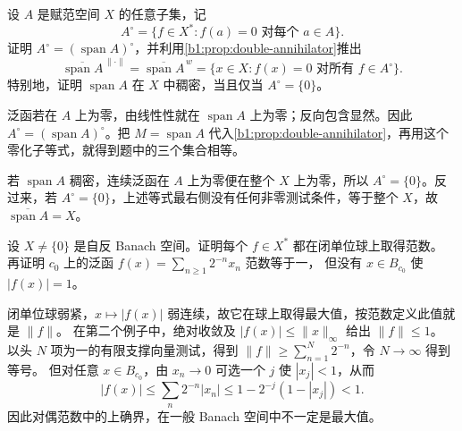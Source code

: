 \begin{exercise}\label{b1:ex:09-double-annihilator}
设 \(A\) 是赋范空间 \(X\) 的任意子集，记
\[
 A^\circ=\{f\in X^*:f(a)=0\text{ 对每个 }a\in A\}.
\]
证明 \(A^\circ=(\operatorname{span}A)^\circ\)，并利用\cref{b1:prop:double-annihilator}推出
\[
 \overline{\operatorname{span}A}^{\,\|\cdot\|}
 =\overline{\operatorname{span}A}^{\,w}
 =\{x\in X:f(x)=0\text{ 对所有 }f\in A^\circ\}.
\]
特别地，证明 \(\operatorname{span}A\) 在 \(X\) 中稠密，当且仅当 \(A^\circ=\{0\}\)。
\end{exercise}
\begin{solution}
泛函若在 \(A\) 上为零，由线性性就在 \(\operatorname{span}A\) 上为零；反向包含显然。因此
\(A^\circ=(\operatorname{span}A)^\circ\)。把 \(M=\operatorname{span}A\) 代入\cref{b1:prop:double-annihilator}，再用这个零化子等式，就得到题中的三个集合相等。

若 \(\operatorname{span}A\) 稠密，连续泛函在 \(A\) 上为零便在整个 \(X\) 上为零，所以 \(A^\circ=\{0\}\)。反过来，若 \(A^\circ=\{0\}\)，上述等式最右侧没有任何非零测试条件，等于整个 \(X\)，故 \(\overline{\operatorname{span}A}=X\)。
\end{solution}

\begin{exercise}\label{b1:ex:09-norm-attainment}
设 \(X\ne\{0\}\) 是自反 Banach 空间。证明每个 \(f\in X^*\) 都在闭单位球上取得范数。
再证明 \(c_0\) 上的泛函 \(f(x)=\sum_{n\geq1}2^{-n}x_n\) 范数等于一，
但没有 \(x\in B_{c_0}\) 使 \(|f(x)|=1\)。
\end{exercise}
\begin{solution}
闭单位球弱紧，\(x\mapsto|f(x)|\) 弱连续，故它在球上取得最大值，按范数定义此值就是 \(\|f\|\)。
在第二个例子中，绝对收敛及 \(|f(x)|\leq\|x\|_\infty\) 给出 \(\|f\|\leq1\)。
以头 \(N\) 项为一的有限支撑向量测试，得到 \(\|f\|\geq\sum_{n=1}^N2^{-n}\)，令 \(N\to\infty\) 得到等号。
但对任意 \(x\in B_{c_0}\)，由 \(x_n\to0\) 可选一个 \(j\) 使 \(|x_j|<1\)，从而
\[
 |f(x)|\leq\sum_n2^{-n}|x_n|
 \leq1-2^{-j}(1-|x_j|)<1.
\]
因此对偶范数中的上确界，在一般 Banach 空间中不一定是最大值。
\end{solution}

